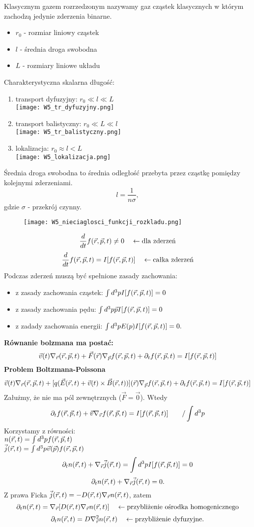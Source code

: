 Klasycznym gazem rozrzedzonym nazywamy gaz cząstek klasycznych w którym zachodzą jedynie zderzenia binarne.
\begin{itemize}
\item[] $r_0$ - rozmiar liniowy cząstek
\item[] $l$ - średnia droga swobodna
\item[] $L$ - rozmiary liniowe układu
\end{itemize}
Charakterystyczna skalarna długość:
\begin{enumerate}
\item transport dyfuzyjny: $r_0 \ll l \ll L$\\
\texttt{[image: W5\_tr\_dyfuzyjny.png]}
\item transport balistyczny: $r_0 \ll L \ll l$\\
\texttt{[image: W5\_tr\_balistyczny.png]}
\item lokalizacja: $r_0 \approx l < L$\\
\texttt{[image: W5\_lokalizacja.png]}
\end{enumerate}
Średnia droga swobodna to średnia odległość przebyta przez cząstkę pomiędzy kolejnymi zderzeniami.
\begin{equation}
l=\dfrac{1}{n\sigma},
\end{equation}
gdzie $\sigma$ - przekrój czynny.
\begin{figure}[h!]
\texttt{[image: W5\_nieciaglosci\_funkcji\_rozkladu.png]}
\end{figure}
$$\dfrac{d}{dt} f(\vec{r},\vec{p},t) \neq 0 \quad \leftarrow \mbox{dla zderzeń}$$
$$\dfrac{d}{dt} f(\vec{r},\vec{p},t) = I[f(\vec{r},\vec{p},t)]\quad \leftarrow \mbox{całka zderzeń}$$
Podczas zderzeń muszą być spełnione zasady zachowania:
\begin{itemize}
\item z zasady zachowania cząstek: $\int d^3p I[f(\vec{r},\vec{p},t)] = 0$
\item z zasady zachowania pędu: $\int d^3p \vec{p}I[f(\vec{r},\vec{p},t)] = 0$
\item z zadady zachowania energii: $\int d^3p E(p) I[f(\vec{r},\vec{p},t)]=0.$
\end{itemize}
\textbf{Równanie bolzmana ma postać:}
$$
\vec{v}(t) \nabla_{\vec{r}} (\vec{r},\vec{p},t) + \vec{F}(\vec{r}) \nabla_{\vec{p}}f(\vec{r},\vec{p},t) +\partial_t f(\vec{r},\vec{p},t) =I[ f(\vec{r},\vec{p},t) ]
$$
\textbf{Problem Boltzmana-Poissona}
$$
\vec{v}(t) \nabla_{\vec{r}} (\vec{r},\vec{p},t) + [q(\vec{E}(\vec{r},t) +\vec{v}(t)\times \vec{B}(\vec{r},t))](\vec{r}) \nabla_{\vec{p}}f(\vec{r},\vec{p},t) +\partial_t f(\vec{r},\vec{p},t) =I[ f(\vec{r},\vec{p},t) ]
$$
Załużmy, że nie ma pól zewnętrznych ($\vec{F}=\vec{0}$). Wtedy
$$\partial_t f(\vec{r},\vec{p},t) + \vec{v}\nabla_{\vec{r}}f(\vec{r},\vec{p},t) = I[f(\vec{r},\vec{p},t)] \qquad / \int d^3p$$
Korzystamy z równości:\\
$n(\vec{r},t) = \int d^3p f(\vec{r},\vec{p},t)$\\
$\vec{j}(\vec{r},t) = \int d^3 p \vec{v}(\vec{p})f(\vec{r},\vec{p},t)$
$$\partial_t n(\vec{r},t) + \nabla_{\vec{r}} \vec{j}(\vec{r},t) = \int d^3p I [f(\vec{r},\vec{p},t)] = 0$$
$$\partial_t n(\vec{r},t) + \nabla_{\vec{r}} \vec{j}(\vec{r},t) = 0 .$$
Z prawa Ficka $ \vec{j}(\vec{r},t) = -D(\vec{r},t) \nabla_{\vec{r}}n(\vec{r},t)$, zatem 
$$\partial_t n(\vec{r},t) = \nabla_{\vec{r}} [D(\vec{r},t) \nabla_{\vec{r}} n(\vec{r},t) ] \quad \leftarrow \mbox{przybliżenie ośrodka homogenicznego}$$
$$\partial_t n(\vec{r},t) = D\nabla_{\vec{r}}^2n(\vec{r},t) \quad \leftarrow \mbox{przybliżenie dyfuzyjne.}$$
